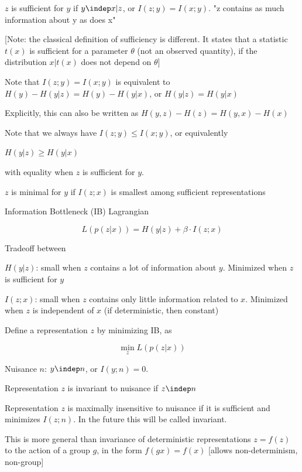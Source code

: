 \documentclass[english]{article}
\begin{document}
\benum 
\item 
$z$ is sufficient for $y$ if $y\indep x|z$, or $I(z;y) = I(x;y)$. "z contains as much information about y as does x" 


 [Note: the classical definition of sufficiency is different. It states that a statistic $t(x)$ is sufficient for a parameter $\theta$ (not an observed quantity), if the distribution $x|t(x)$ does not depend on $\theta$]



Note that $I(z;y) = I(x;y)$ is equivalent to $H(y)-H(y|z)=H(y)-H(y|x)$, or $H(y|z)=H(y|x)$

Explicitly, this can also be written as  $H(y,z)-H(z)=H(y,x)-H(x)$

Note that we always have $I(z;y) \le I(x;y)$, or equivalently 

$H(y|z)\ge H(y|x)$

with equality when $z$ is sufficient for $y$.

\item $z$ is minimal for $y$ if $I(z;x)$ is smallest among sufficient representations
\eenum 

\item Information Bottleneck (IB) Lagrangian

$$L(p(z|x)) = H(y|z) +\beta \cdot I(z;x)$$

Tradeoff between

\benum 
\item $H(y|z)$: small when $z$  contains a lot of information about $y$. Minimized when $z$ is sufficient for $y$


\item $I(z;x)$: small when $z$ contains only little information related to $x$. Minimized when $z$ is independent of $x$ (if deterministic, then constant)

\eenum 

Define a representation $z$ by minimizing IB, as 

$$\min_z L(p(z|x))$$

\item Nuisance $n$: $y\indep n$, or $I(y;n)=0$.

Representation $z$ is invariant to nuisance if $z\indep n$

Representation $z$ is maximally insensitive to nuisance if it is sufficient and minimizes $I(z;n)$. In the future this will be called invariant.

This is more general than invariance of deterministic representations $z =f(z)$ to the action of a group $g$, in the form $f(gx)=f(x)$ [allows non-determinism, non-group]
\end{document}
